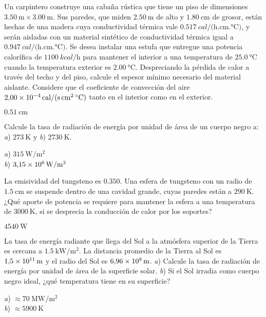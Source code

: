 %
\begin{Exercise}
  Un carpintero construye una cabaña rústica que tiene un piso de dimensiones $\SI{3.50}{\metre} \times \SI{3.00}{\metre}$. Sus paredes, que miden $\SI{2.50}{\metre}$ de alto y $\SI{1.80}{\centi\metre}$ de grosor, están hechas de una madera cuya conductividad térmica vale $\SI{0.517}{cal/(\hour.\centi\metre.\celsius)}$, y serán aisladas con un material sintético de conductividad térmica igual a $\SI{0.947}{cal/(\hour.\centi\metre.\celsius)}$. Se desea instalar una estufa que entregue una potencia calorífica de $\SI{1100}{kcal/\hour}$ para mantener el interior a una temperatura de $\SI{25.0}{\celsius}$ cuando la temperatura exterior es $\SI{2.00}{\celsius}$. Despreciando la pérdida de calor a través del techo y del piso, calcule el espesor mínimo necesario del material aislante. Considere que el  coeficiente de convección del aire $\SI{2.00E-4}{cal/(\second.\centi\square\metre.\celsius)}$ tanto en el interior como en el exterior.
\end{Exercise}
\begin{Answer}
  $\SI{0.51}{\centi\metre}$
\end{Answer}
%
\begin{Exercise}
  Calcule la tasa de radiación de energía por unidad de área de un cuerpo negro a: \textit{a}) $\SI{273}{\kelvin}$ y \textit{b}) $\SI{2730}{\kelvin}$.
\end{Exercise}
\begin{Answer}
	\begin{minipage}[t]{.4\textwidth}
    \textit{a}) $\SI{315}{\watt/\square\metre}$\\ \textit{b}) $\SI{3.15E6}{\watt/\square\metre}$
  \end{minipage}
\end{Answer}
%
\begin{Exercise}
  La emisividad del tungsteno es $0.350$. Una esfera de tungsteno con un radio de $\SI{1.5}{\centi\metre}$ se suspende dentro de una cavidad grande, cuyas paredes están a $\SI{290}{\kelvin}$. ¿Qué aporte de potencia se requiere para mantener la esfera a una temperatura de $\SI{3000}{\kelvin}$, si se desprecia la conducción de calor por los soportes?
\end{Exercise}
\begin{Answer}
  $\SI{4540}{\watt}$
\end{Answer}
%
\begin{Exercise}
  La tasa de energía radiante que llega del Sol a la atmósfera superior de la Tierra es cercana a $\SI{1.5}{\kilo\watt/\square\metre}$. La distancia promedio de la Tierra al Sol es $\SI{1.5E11}{\metre}$ y el radio del Sol es $\SI{6.96E8}{\metre}$. \textit{a}) Calcule la tasa de radiación de energía por unidad de área de la superficie solar. \textit{b}) Si el Sol irradia como cuerpo negro ideal, ¿qué temperatura tiene en su superficie?
\end{Exercise}
\begin{Answer}
  \textit{a}) $\approx\SI{70}{\mega\watt/\square\metre}$\\ \textit{b}) $\approx\SI{5900}{\kelvin}$
\end{Answer}
%